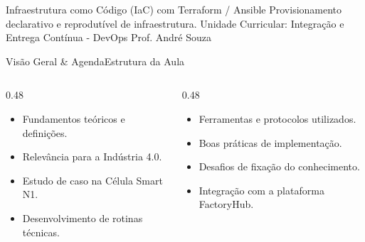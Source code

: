 
\senaicover
  {Infraestrutura como Código (IaC) com Terraform / Ansible}
  {Provisionamento declarativo e reprodutível de infraestrutura.}
  {Unidade Curricular: Integração e Entrega Contínua - DevOps}
  {Prof. André Souza}

\begin{senaiframe}{Visão Geral \& Agenda}{Estrutura da Aula}
  \begin{columns}[t]
    \begin{column}{0.48\textwidth}
      \begin{tcolorbox}[senaibluecard, title={1. Conceitos Chave}]
        \begin{itemize}
          \item Fundamentos teóricos e definições.
          \item Relevância para a Indústria 4.0.
        \end{itemize}
      \end{tcolorbox}
      \vspace{4pt}
      \begin{tcolorbox}[senaiambercard, title={3. Aplicação Prática}]
        \begin{itemize}
          \item Estudo de caso na Célula Smart N1.
          \item Desenvolvimento de rotinas técnicas.
        \end{itemize}
      \end{tcolorbox}
    \end{column}
    \begin{column}{0.48\textwidth}
      \begin{tcolorbox}[senairedcard, title={2. Detalhamento Técnico}]
        \begin{itemize}
          \item Ferramentas e protocolos utilizados.
          \item Boas práticas de implementação.
        \end{itemize}
      \end{tcolorbox}
      \vspace{4pt}
      \begin{tcolorbox}[senaigreencard, title={4. Exercícios \& Avaliação}]
        \begin{itemize}
          \item Desafios de fixação do conhecimento.
          \item Integração com a plataforma FactoryHub.
        \end{itemize}
      \end{tcolorbox}
    \end{column}
  \end{columns}
\end{senaiframe}

